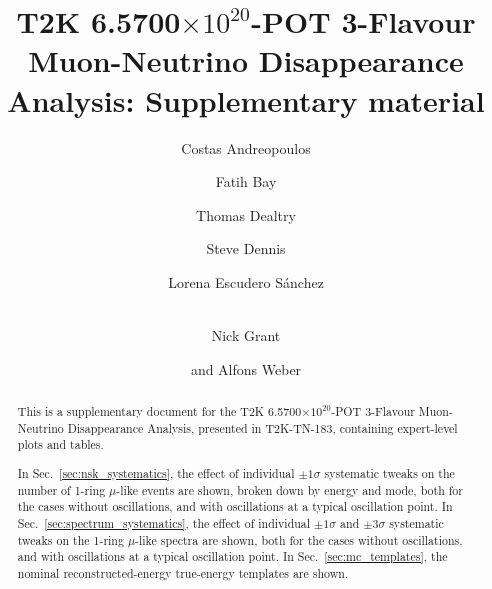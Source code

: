 %
%

\begin{frontmatter}

\title{
  T2K 6.5700$\times10^{20}$-POT 3-Flavour Muon-Neutrino Disappearance Analysis:
  Supplementary material
}

\vspace*{0.7cm}

\author[RAL,LIV]  {Costas Andreopoulos}
\author[ETHZ]     {Fatih Bay}
\author[RAL,OXF]  {Thomas Dealtry}
\author[RAL,WAR]  {Steve Dennis}
\author[IFIC]     {Lorena Escudero S\'anchez}
\author[LANCS]    {\\Nick Grant}
\author[RAL,OXF]  {and Alfons Weber}

\address[RAL]   {Science \& Technology Facilities Council (STFC), Rutherford Appleton Laboratory,\\ Harwell Oxford Campus, OX11 0QX, UK}
\address[LIV]   {University of Liverpool, Physics Department,\\ Liverpool, L69 7ZE, UK} 
\address[ETHZ]  {ETH Zurich, Institute for Particle Physics,\\ 8092 Zurich, Switzerland}
\address[OXF]   {University of Oxford, Subdepartment of Particle Physics,\\ Oxford, OX1 3RH, UK}
\address[WAR]   {University of Warwick, Physics Department,\\ Coventry, CV4 7AL, UK}
\address[IFIC]  {CSIC and University of Valencia, Instituto de Fisica Corpuscular, \\ E-46071 Valencia, Spain}
\address[LANCS] {Lancaster University, Physics Department,\\ Lancaster, LA1 4YB, UK}

%
%

\begin{abstract}

  This is a supplementary document for the T2K 6.5700$\times10^{20}$-POT 3-Flavour Muon-Neutrino Disappearance Analysis,
  presented in T2K-TN-183,
  containing expert-level plots and tables.

  In Sec.\ \ref{sec:nsk_systematics}, the effect of individual $\pm1\sigma$ systematic tweaks on the number of 1-ring $\mu$-like
  events are shown, broken down by energy and mode, both for the cases
  without oscillations, and with oscillations at a typical oscillation point.
  In Sec.\ \ref{sec:spectrum_systematics}, the effect of individual $\pm1\sigma$ and $\pm3\sigma$ systematic tweaks on the 1-ring $\mu$-like spectra
  are shown, both for the cases
  without oscillations, and with oscillations at a typical oscillation point.
  In Sec.\ \ref{sec:mc_templates}, the nominal reconstructed-energy true-energy templates are shown.

\end{abstract}

%
%


\end{frontmatter}

\clearpage

\tableofcontents

\clearpage

\listoftables

\listoffigures


